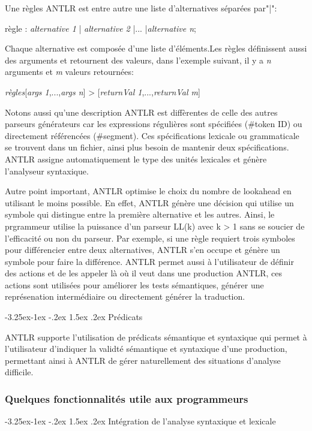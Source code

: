 \documentclass{article}
\makeatletter
\newcounter {subsubsubsection}[subsubsection]
\newcommand\subsubsubsection{\@startsection{subsubsubsection}{4}{\z@}%
                                     {-3.25ex\@plus -1ex \@minus -.2ex}%
                                     {1.5ex \@plus .2ex}%
                                     {\normalfont\normalsize\bfseries}}
\makeatother
\begin{document}
Une règles ANTLR est entre autre une liste d'alternatives séparées par"|":


règle : \textit{alternative \textsl{1}} | \textit{alternative \textsl{2}} |... |\textit{alternative \textsl{n}};


Chaque alternative est composée d'une liste d'éléments.Les règles définissent aussi des arguments et retournent des valeurs, dans l'exemple suivant, il y a \textsl{n} arguments et \textsl{m} valeurs retournées:


\textit{règles}[\textit{args \textsl{1}},...,\textit{args \textsl{n}}] > [\textit{returnVal \textsl{1}},...,\textit{returnVal \textsl{m}}]


Notons aussi qu'une description ANTLR est diffèrentes de celle des autres parseurs générateurs car les expressions régulières sont spécifiées (\#token ID) ou directement référencées (\#segment). Ces spécifications lexicale ou grammaticale se trouvent dans un fichier, ainsi plus besoin de mantenir deux spécifications. ANTLR assigne automatiquement le type des unités lexicales et génère l'analyseur syntaxique.

Autre point important, ANTLR optimise le choix du nombre de lookahead en utilisant le moins possible. En effet, ANTLR génère une décision qui utilise un symbole qui distingue entre la première alternative et les autres. Ainsi, le prgrammeur utilise la puissance d'un parseur LL(k) avec k > 1 sans se soucier de l'efficacité ou non du parseur. Par exemple, si une règle requiert trois symboles pour différencier entre deux alternatives, ANTLR s'en occupe et génère un symbole pour faire la différence.
ANTLR permet aussi à l'utilisateur de définir des actions et de les appeler là où il veut dans une production ANTLR, ces actions sont utilisées pour améliorer les tests sémantiques, générer une représenation intermédiaire ou directement générer la traduction.

\subsubsubsection{Prédicats}

ANTLR supporte l'utilisation de prédicats sémantique et syntaxique qui permet à l'utilisateur d'indiquer la validté sémantique et syntaxique d'une production, permettant ainsi à ANTLR de gérer naturellement des situations d'analyse difficile.

\subsubsection{Quelques fonctionnalités utile aux programmeurs}

\subsubsubsection{Intégration de l'analyse syntaxique et lexicale}
\end{document}
